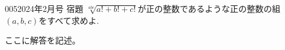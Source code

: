 \begin{prob}{005}{}{2024年2月号 宿題}
 $\sqrt[abc]{a! + b! + c!}$が正の整数であるような正の整数の組$(a,b,c)$をすべて求めよ.
\end{prob}

ここに解答を記述。
